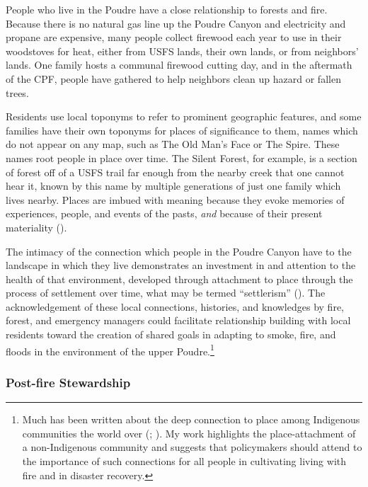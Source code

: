 \documentclass[
]{article}
\begin{document}
People who live in the Poudre have a close relationship to forests and fire. Because there is no natural gas line up the Poudre Canyon and electricity and propane are expensive, many people collect firewood each year to use in their woodstoves for heat, either from USFS lands, their own lands, or from neighbors' lands. One family hosts a communal firewood cutting day, and in the aftermath of the CPF, people have gathered to help neighbors clean up hazard or fallen trees.

Residents use local toponyms to refer to prominent geographic features, and some families have their own toponyms for places of significance to them, names which do not appear on any map, such as The Old Man's Face or The Spire. These names root people in place over time. The Silent Forest, for example, is a section of forest off of a USFS trail far enough from the nearby creek that one cannot hear it, known by this name by multiple generations of just one family which lives nearby. Places are imbued with meaning because they evoke memories of experiences, people, and events of the pasts, \emph{and} because of their present materiality ().

The intimacy of the connection which people in the Poudre Canyon have to the landscape in which they live demonstrates an investment in and attention to the health of that environment, developed through attachment to place through the process of settlement over time, what may be termed ``settlerism'' (). The acknowledgement of these local connections, histories, and knowledges by fire, forest, and emergency managers could facilitate relationship building with local residents toward the creation of shared goals in adapting to smoke, fire, and floods in the environment of the upper Poudre.\footnote{Much has been written about the deep connection to place among Indigenous communities the world over (; ). My work highlights the place-attachment of a non-Indigenous community and suggests that policymakers should attend to the importance of such connections for all people in cultivating living with fire and in disaster recovery.}

\subsubsection{Post-fire Stewardship}\label{post-fire-stewardship}
\end{document}
